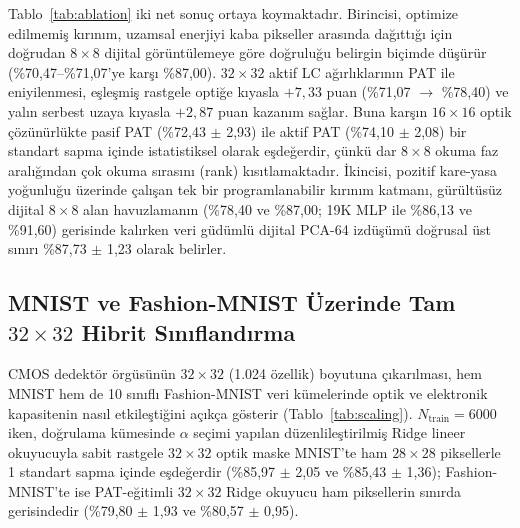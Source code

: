 \documentclass[journal]{IEEEtran}
\begin{document}
Tablo~\ref{tab:ablation} iki net sonu\c{c} ortaya koymaktad\i{}r. Birincisi, optimize edilmemi\c{s} k\i{}r\i{}n\i{}m, uzamsal enerjiyi kaba pikseller aras\i{}nda da\u{g}\i{}tt\i{}\u{g}\i{} i\c{c}in do\u{g}rudan $8\times 8$ dijital g\"or\"unt\"ulemeye g\"ore do\u{g}rulu\u{g}u belirgin bi\c{c}imde d\"u\c{s}\"ur\"ur (\%70,47--\%71,07'ye kar\c{s}\i{} \%87,00). $32\times 32$ aktif LC a\u{g}\i{}rl\i{}klar\i{}n\i{}n PAT ile eniyilenmesi, e\c{s}le\c{s}mi\c{s} rastgele opti\u{g}e k\i{}yasla $+7{,}33$ puan (\%71,07 $\to$ \%78,40) ve yal\i{}n serbest uzaya k\i{}yasla $+2{,}87$ puan kazan\i{}m sa\u{g}lar. Buna kar\c{s}\i{}n $16\times 16$ optik \c{c}\"oz\"un\"url\"ukte pasif PAT (\%72,43 $\pm$ 2,93) ile aktif PAT (\%74,10 $\pm$ 2,08) bir standart sapma i\c{c}inde istatistiksel olarak e\c{s}de\u{g}erdir, \c{c}\"unk\"u dar $8\times 8$ okuma faz aral\i{}\u{g}\i{}ndan \c{c}ok okuma s\i{}ras\i{}n\i{} (rank) k\i{}s\i{}tlamaktad\i{}r. \.{I}kincisi, pozitif kare-yasa yo\u{g}unlu\u{g}u \"uzerinde \c{c}al\i{}\c{s}an tek bir programlanabilir k\i{}r\i{}n\i{}m katman\i{}, g\"ur\"ult\"us\"uz dijital $8\times 8$ alan havuzlaman\i{}n (\%78,40 ve \%87,00; 19K MLP ile \%86,13 ve \%91,60) gerisinde kal\i{}rken veri g\"ud\"uml\"u dijital PCA-64 izd\"u\c{s}\"um\"u do\u{g}rusal \"ust s\i{}n\i{}r\i{} \%87,73 $\pm$ 1,23 olarak belirler.

\subsection{MNIST ve Fashion-MNIST \"Uzerinde Tam $32\times 32$ Hibrit S\i{}n\i{}fland\i{}rma}
CMOS dedekt\"or \"org\"us\"un\"un $32\times 32$ (1.024 \"ozellik) boyutuna \c{c}\i{}kar\i{}lmas\i{}, hem MNIST \cite{lecun1998mnist} hem de 10 s\i{}n\i{}fl\i{} Fashion-MNIST \cite{xiao2017fashion} veri k\"umelerinde optik ve elektronik kapasitenin nas\i{}l etkile\c{s}ti\u{g}ini a\c{c}\i{}k\c{c}a g\"osterir (Tablo~\ref{tab:scaling}). $N_{\mathrm{train}}=6000$ iken, do\u{g}rulama k\"umesinde $\alpha$ se\c{c}imi yap\i{}lan d\"uzenlile\c{s}tirilmi\c{s} Ridge lineer okuyucuyla sabit rastgele $32\times 32$ optik maske MNIST'te ham $28\times 28$ piksellerle 1 standart sapma i\c{c}inde e\c{s}de\u{g}erdir (\%85,97 $\pm$ 2,05 ve \%85,43 $\pm$ 1,36); Fashion-MNIST'te ise PAT-e\u{g}itimli $32\times 32$ Ridge okuyucu ham piksellerin s\i{}n\i{}rda gerisindedir (\%79,80 $\pm$ 1,93 ve \%80,57 $\pm$ 0,95).
\end{document}
